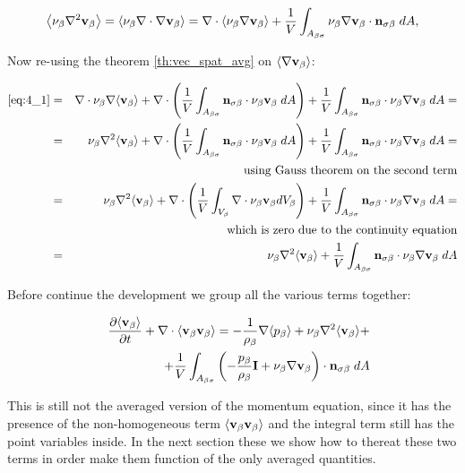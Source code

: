 \begin{equation}
{\left< \nu_{\beta}\nabla^2 \textbf{v}_{\beta}\right>} = {\left< \nu_{\beta}\nabla \cdot \nabla \textbf{v}_{\beta} \right>} = \nabla \cdot {\left< \nu_{\beta}\nabla \textbf{v}_{\beta}\right>} +\dfrac{1}{V} \int_{A_{\beta \sigma}}  \nu_{\beta} \nabla \textbf{v}_{\beta} \cdot \mathbf{n}_{\sigma \beta} \;dA,
\label{eq:4_1}
\end{equation}

Now re-using the theorem \ref{th:vec_spat_avg} on ${\left< \nabla \textbf{v}_{\beta} \right>}$:

\begin{eqnarray}
	\eqref{eq:4_1} &=& \nabla \cdot \nu_{\beta} \nabla {\left< \textbf{v}_{\beta}\right>} + \nabla \cdot \left( \dfrac{1}{V} \int_{A_{\beta \sigma}} \mathbf{n}_{\sigma \beta} \cdot \nu_{\beta} \textbf{v}_{\beta} \;dA \right) + \dfrac{1}{V} \int_{A_{\beta \sigma}} \mathbf{n}_{\sigma \beta} \cdot \nu_{\beta} \nabla \textbf{v}_{\beta} \;dA = \nonumber \\
	&=& \nu_{\beta}\nabla^2 {\left< \textbf{v}_{\beta} \right>} +  \nabla \cdot \left( \dfrac{1}{V} \int_{A_{\beta \sigma}} \mathbf{n}_{\sigma \beta} \cdot \nu_{\beta} \textbf{v}_{\beta} \;dA \right) + \dfrac{1}{V} \int_{A_{\beta \sigma}} \mathbf{n}_{\sigma \beta} \cdot \nu_{\beta} \nabla \textbf{v}_{\beta} \;dA  = \nonumber \\
	&& \text{using Gauss theorem on the second term} \nonumber \\
	&=& \nu_{\beta}\nabla^2 {\left< \textbf{v}_{\beta} \right>} +  \nabla \cdot \left( \dfrac{1}{V} \int_{V_\beta} \nabla \cdot \nu_{\beta} \textbf{v}_{\beta} dV_\beta \right) + \dfrac{1}{V} \int_{A_{\beta \sigma}} \mathbf{n}_{\sigma \beta} \cdot \nu_{\beta} \nabla \textbf{v}_{\beta} \;dA = \nonumber \\
	&& \text{which is zero due to the continuity equation} \nonumber \\
	&=& \nu_{\beta}\nabla^2 {\left< \textbf{v}_{\beta} \right>} + \dfrac{1}{V} \int_{A_{\beta \sigma}} \mathbf{n}_{\sigma \beta} \cdot \nu_{\beta} \nabla \textbf{v}_{\beta} \;dA
\end{eqnarray}


Before continue the development we group all the various terms together:

\begin{eqnarray}
&& \dfrac{\partial {\left< \textbf{v}_{\beta}\right>}}{\partial t} + \nabla \cdot {\left< \textbf{v}_{\beta}\textbf{v}_{\beta}\right>} = -\dfrac{1}{\rho_{\beta}} \nabla {\left< p_{\beta}\right>} + \nu_{\beta}\nabla^2 {\left< \textbf{v}_{\beta} \right>} + \nonumber \\
&& +\dfrac{1}{V} \int_{A_{\beta \sigma}} \left( -\dfrac{p_{\beta}}{\rho_{\beta}} \mathbf{I} + \nu_{\beta} \nabla \textbf{v}_{\beta}  \right)\cdot \mathbf{n}_{\sigma \beta} \;dA \nonumber \\
\label{eq:mom_2}
\end{eqnarray}

This is still not the averaged version of the momentum equation, since it has the presence of the non-homogeneous term ${\left< \textbf{v}_{\beta}\textbf{v}_{\beta} \right>}$ and the integral term still has the point variables inside.
In the next section these we show how to thereat these two terms in order make them function of the only averaged quantities.

